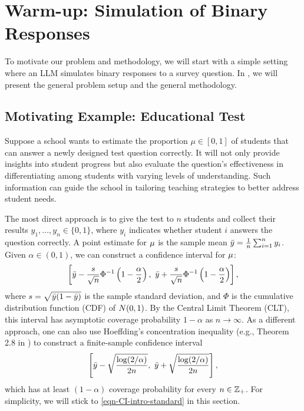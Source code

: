 \section{Warm-up: Simulation of Binary Responses}\label{sec-warmup}

To motivate our problem and methodology, we will start with a simple setting where an LLM simulates binary responses to a survey question. In , we will present the general problem setup and the general methodology.

\subsection{Motivating Example: Educational Test}\label{sec-example-education}

Suppose a school wants to estimate the proportion $\mu \in [0,1]$ of students that can answer a newly designed test question correctly. It will not only provide insights into student progress but also evaluate the question's effectiveness in differentiating among students with varying levels of understanding. Such information can guide the school in tailoring teaching strategies to better address student needs.

The most direct approach is to give the test to $n$ students and collect their results $y_1,...,y_n\in\{0,1\}$, where $y_i$ indicates whether student $i$ answers the question correctly. A point estimate for $\mu$ is the sample mean $\bar{y} = \frac{1}{n} \sum_{i=1}^n y_i$. Given $\alpha\in(0,1)$, we can construct a confidence interval for $\mu$:
\begin{equation}\label{eqn-CI-intro-standard}
\left[ \bar{y} - \frac{s}{\sqrt{n}} \Phi^{-1}\left( 1- \frac{\alpha}{2} \right) , ~  \bar{y} + \frac{s}{\sqrt{n}} \Phi^{-1}\left( 1 - \frac{\alpha}{2} \right) \right],
\end{equation}
where $s = \sqrt{\bar{y} (1-\bar{y}) }$ is the sample standard deviation, and $\Phi$ is the cumulative distribution function (CDF) of $N(0,1)$. By the Central Limit Theorem (CLT), this interval has asymptotic coverage probability $1-\alpha$ as $n\to\infty$. As a different approach, one can also use Hoeffding's concentration inequality (e.g., Theorem 2.8 in \cite{BLM13}) to construct a finite-sample confidence interval
\begin{equation}
\left[ \bar{y} - \sqrt{\frac{\log(2/\alpha)}{2n}}  , ~  \bar{y} + \sqrt{\frac{\log(2/\alpha)}{2n}} \right],
\end{equation}
which has at least $(1-\alpha)$ coverage probability for every $n\in\mathbb{Z}_+$. For simplicity, we will stick to \eqref{eqn-CI-intro-standard} in this section.

